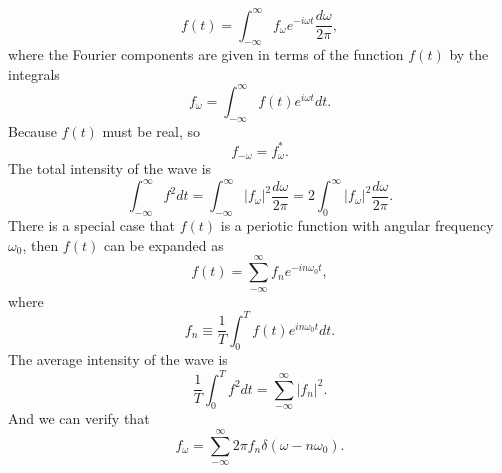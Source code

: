 \[f(t) = \int_{-\infty}^{\infty} f_{\omega}e^{-i\omega t} \frac{d\omega}{2\pi},\]
where the Fourier components are given in terms of the function $f(t)$ by the integrals
\[f_{\omega} = \int_{-\infty}^{\infty} f(t)e^{i\omega t} dt.\]
Because $f(t)$ must be real, so
\[f_{-\omega} = f_{\omega}^{*}.\]
The total intensity of the wave is
\[\int_{-\infty}^{\infty} f^2 dt = \int_{-\infty}^{\infty} |f_{\omega}|^2 \frac{d\omega}{2\pi} = 2\int_{0}^{\infty} |f_{\omega}|^2 \frac{d\omega}{2\pi} .\]
There is a special case that $f(t)$ is a periotic function with angular frequency $\omega_0$, then $f(t)$ can be expanded as
\[f(t) = \sum_{-\infty}^{\infty} f_n e^{-in\omega_0t},\]
where
\[f_n \equiv \frac{1}{T} \int_{0}^{T} f(t)e^{in\omega_0t} dt.\]
The average intensity of the wave is
\[\frac{1}{T}\int_{0}^{T} f^2 dt = \sum_{-\infty}^{\infty} |f_n|^2.\]
And we can verify that
\[f_{\omega} = \sum_{-\infty}^{\infty} 2\pi f_n \delta(\omega-n\omega_0).\]

